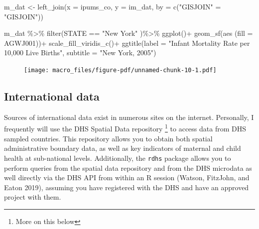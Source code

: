\documentclass[
  letterpaper,
  DIV=11,
  numbers=noendperiod]{scrreprt}
\newenvironment{Shaded}{\begin{snugshade}}{\end{snugshade}}
\newcommand{\AttributeTok}[1]{\textcolor[rgb]{0.40,0.45,0.13}{#1}}
\newcommand{\FunctionTok}[1]{\textcolor[rgb]{0.28,0.35,0.67}{#1}}
\newcommand{\NormalTok}[1]{\textcolor[rgb]{0.00,0.23,0.31}{#1}}
\newcommand{\OtherTok}[1]{\textcolor[rgb]{0.00,0.23,0.31}{#1}}
\newcommand{\SpecialCharTok}[1]{\textcolor[rgb]{0.37,0.37,0.37}{#1}}
\newcommand{\StringTok}[1]{\textcolor[rgb]{0.13,0.47,0.30}{#1}}
\begin{document}
\begin{Shaded}
\begin{Highlighting}[]
\NormalTok{m\_dat }\OtherTok{\textless{}{-}} \FunctionTok{left\_join}\NormalTok{(}\AttributeTok{x =}\NormalTok{ ipums\_co,}
                   \AttributeTok{y =}\NormalTok{ im\_dat,}
                   \AttributeTok{by =} \FunctionTok{c}\NormalTok{(}\StringTok{"GISJOIN"} \OtherTok{=} \StringTok{"GISJOIN"}\NormalTok{))}

\NormalTok{m\_dat }\SpecialCharTok{\%\textgreater{}\%}
  \FunctionTok{filter}\NormalTok{(STATE }\SpecialCharTok{==} \StringTok{"New York"}\NormalTok{ )}\SpecialCharTok{\%\textgreater{}\%}
  \FunctionTok{ggplot}\NormalTok{()}\SpecialCharTok{+}
  \FunctionTok{geom\_sf}\NormalTok{(}\FunctionTok{aes}\NormalTok{ (}\AttributeTok{fill =}\NormalTok{ AGWJ001))}\SpecialCharTok{+}
  \FunctionTok{scale\_fill\_viridis\_c}\NormalTok{()}\SpecialCharTok{+}
  \FunctionTok{ggtitle}\NormalTok{(}\AttributeTok{label =} \StringTok{"Infant Mortality Rate per 10,000 Live Births"}\NormalTok{,}
          \AttributeTok{subtitle =} \StringTok{"New York, 2005"}\NormalTok{)}
\end{Highlighting}
\end{Shaded}

\begin{figure}[H]

{\centering \texttt{[image: macro\_files/figure-pdf/unnamed-chunk-10-1.pdf]}

}

\end{figure}

\hypertarget{international-data}{%
\subsection{International data}\label{international-data}}

Sources of international data exist in numerous sites on the internet.
Personally, I frequently will use the DHS Spatial Data repository
\footnote{More on this below} to access data from DHS sampled countries.
This repository allows you to obtain both spatial administrative
boundary data, as well as key indicators of maternal and child health at
sub-national levels. Additionally, the \texttt{rdhs} package allows you
to perform queries from the spatial data repository and from the DHS
microdata as well directly via the DHS API from within an R session
(Watson, FitzJohn, and Eaton 2019), assuming you have registered with
the DHS and have an approved project with them.
\end{document}

